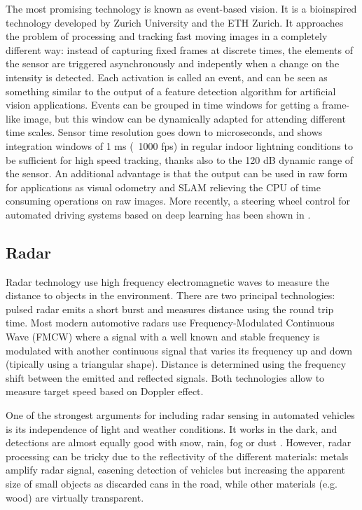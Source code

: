 The most promising technology is known as event-based vision. It is a 
bioinspired technology developed by Zurich University and the ETH Zurich. 
It approaches the problem of processing and tracking fast 
moving images in a completely different way: instead of capturing fixed frames
at discrete times, the elements of the sensor are triggered asynchronously and
indepently when a change on the intensity is detected. Each activation is
called an event, and can be seen as something similar to the output of a 
feature detection algorithm for artificial vision applications.
Events can be grouped in time windows for getting a frame-like image, but this
window can be dynamically adapted for attending different time scales.
Sensor time resolution goes down to microseconds, and \cite{Mueggler2014} shows 
integration windows of 1 ms (~1000 fps) in regular indoor lightning conditions
to be sufficient for high speed tracking, thanks also to the 120 dB dynamic 
range of the sensor.
An additional advantage is that the output can be used in raw form for 
applications as visual odometry \cite{Censi2014} and SLAM \cite{Vidal2017}
relieving the CPU of time consuming operations on raw images.
More recently, a steering wheel control for automated driving systems 
based on deep learning has been shown in \cite{Maqueda2018}.
 
 

\subsection{Radar}

Radar technology use high frequency electromagnetic waves to measure the
distance to objects in the environment.
There are two principal technologies: pulsed radar emits a short burst and 
measures distance using the round trip time. Most modern automotive 
radars use Frequency-Modulated Continuous Wave (FMCW) where a signal with
a well known and stable frequency is modulated with another continuous signal
that varies its frequency up and down (tipically using a triangular shape).
Distance is determined using the frequency shift between the emitted and 
reflected signals. Both technologies allow to measure target speed based
on Doppler effect.

One of the strongest arguments for including radar sensing in automated 
vehicles is its independence of light and weather conditions. 
It works in the dark, and detections are almost equally good with snow, 
rain, fog or dust \cite{Reina2015}.
However, radar processing can be tricky due to the reflectivity of the
different materials: metals amplify radar signal, easening detection of 
vehicles but increasing the apparent size of small objects as discarded cans
in the road, while other materials (e.g. wood) are virtually transparent.

